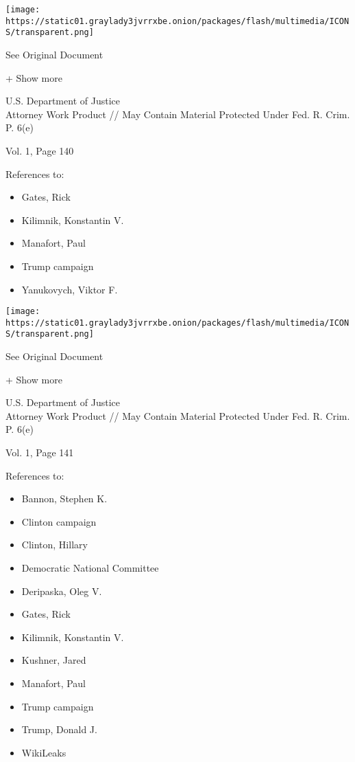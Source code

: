 \protect\hyperlink{}{}

\texttt{[image: https://static01.graylady3jvrrxbe.onion/packages/flash/multimedia/ICONS/transparent.png]}

See Original Document

+ Show more

U.S. Department of Justice\\
Attorney Work Product // May Contain Material Protected Under Fed. R.
Crim. P. 6(e)

Vol. 1, Page 140

References to:

\begin{itemize}
\tightlist
\item
  Gates, Rick
\item
  Kilimnik, Konstantin V.
\item
  Manafort, Paul 
\item
  Trump campaign
\item
  Yanukovych, Viktor F.
\end{itemize}

\protect\hyperlink{}{}

\texttt{[image: https://static01.graylady3jvrrxbe.onion/packages/flash/multimedia/ICONS/transparent.png]}

See Original Document

+ Show more

U.S. Department of Justice\\
Attorney Work Product // May Contain Material Protected Under Fed. R.
Crim. P. 6(e)

Vol. 1, Page 141

References to:

\begin{itemize}
\tightlist
\item
  Bannon, Stephen K.
\item
  Clinton campaign
\item
  Clinton, Hillary
\item
  Democratic National Committee
\item
  Deripaska, Oleg V.
\item
  Gates, Rick
\item
  Kilimnik, Konstantin V.
\item
  Kushner, Jared
\item
  Manafort, Paul 
\item
  Trump campaign
\item
  Trump, Donald J.
\item
  WikiLeaks
\end{itemize}

